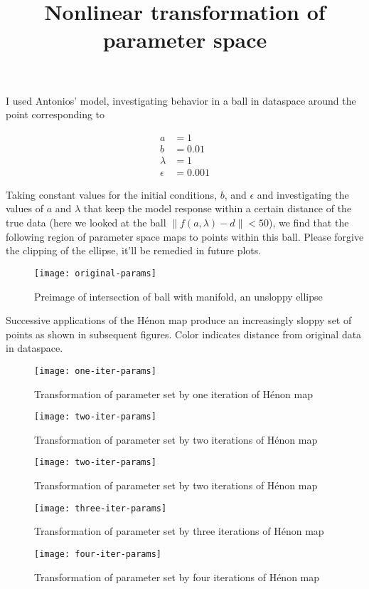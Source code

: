 \documentclass[11pt]{article}
\title{Nonlinear transformation of parameter space}
\begin{document}
\maketitle

I used Antonios' model, investigating behavior in a ball in dataspace
around the point corresponding to

\begin{align*}
  a &= 1 \\
  b &= 0.01 \\
  \lambda &= 1 \\
  \epsilon &= 0.001
\end{align*}

Taking constant values for the initial conditions, $b$, and $\epsilon$
and investigating the values of $a$ and $\lambda$ that keep the model
response within a certain distance of the true data (here we looked at
the ball $\| f(a, \lambda) - d \| < 50$), we find that the following
region of parameter space maps to points within this ball. Please
forgive the clipping of the ellipse, it'll be remedied in future
plots. \\

\begin{figure}[htbp]
  \centering
  \texttt{[image: original-params]}
  \caption{Preimage of intersection of ball with manifold, an unsloppy
  ellipse}
\end{figure}

Successive applications of the H\'{e}non map produce an increasingly
sloppy set of points as shown in subsequent figures. Color indicates
distance from original data in dataspace.


\begin{figure}[htbp]
  \centering
  \texttt{[image: one-iter-params]}
  \caption{Transformation of parameter set by one iteration of H\'{e}non map}
\end{figure}


\begin{figure}[htbp]
  \centering
  \texttt{[image: two-iter-params]}
  \caption{Transformation of parameter set by two iterations of H\'{e}non map}
\end{figure}

\begin{figure}[htbp]
  \centering
  \texttt{[image: two-iter-params]}
  \caption{Transformation of parameter set by two iterations of H\'{e}non map}
\end{figure}

\begin{figure}[htbp]
  \centering
  \texttt{[image: three-iter-params]}
  \caption{Transformation of parameter set by three iterations of H\'{e}non map}
\end{figure}

\begin{figure}[htbp]
  \centering
  \texttt{[image: four-iter-params]}
  \caption{Transformation of parameter set by four iterations of H\'{e}non map}
\end{figure}

% 
% 
\end{document}
